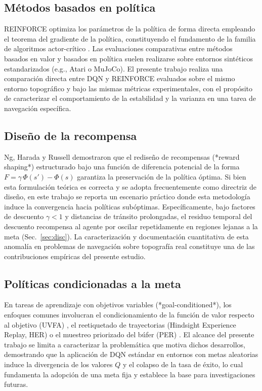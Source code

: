 \subsection{Métodos basados en política}
REINFORCE \cite{williams1992} optimiza los parámetros de la política de forma directa empleando el teorema del gradiente de la política, constituyendo el fundamento de la familia de algoritmos actor-crítico \cite{mnih2016}. Las evaluaciones comparativas entre métodos basados en valor y basados en política suelen realizarse sobre entornos sintéticos estandarizados (e.g., Atari o MuJoCo). El presente trabajo realiza una comparación directa entre DQN y REINFORCE evaluados sobre el mismo entorno topográfico y bajo las mismas métricas experimentales, con el propósito de caracterizar el comportamiento de la estabilidad y la varianza en una tarea de navegación específica.

\subsection{Diseño de la recompensa}
Ng, Harada y Russell \cite{ng1999} demostraron que el rediseño de recompensas (*reward shaping*) estructurado bajo una función de diferencia potencial de la forma $F=\gamma\,\Phi(s')-\Phi(s)$ garantiza la preservación de la política óptima. Si bien esta formulación teórica es correcta y se adopta frecuentemente como directriz de diseño, en este trabajo se reporta un escenario práctico donde esta metodología induce la convergencia hacia políticas subóptimas. Específicamente, bajo factores de descuento $\gamma < 1$ y distancias de tránsito prolongadas, el residuo temporal del descuento recompensa al agente por oscilar repetidamente en regiones lejanas a la meta (Sec.~\ref{sec:disc}). La caracterización y documentación cuantitativa de esta anomalía en problemas de navegación sobre topografía real constituye una de las contribuciones empíricas del presente estudio.

\subsection{Políticas condicionadas a la meta}
En tareas de aprendizaje con objetivos variables (*goal-conditioned*), los enfoques comunes involucran el condicionamiento de la función de valor respecto al objetivo (UVFA) \cite{schaul2015}, el reetiquetado de trayectorias (Hindsight Experience Replay, HER) \cite{andrychowicz2017} o el muestreo priorizado del búfer (PER) \cite{schaul2016}. El alcance del presente trabajo se limita a caracterizar la problemática que motiva dichos desarrollos, demostrando que la aplicación de DQN estándar en entornos con metas aleatorias induce la divergencia de los valores $Q$ y el colapso de la tasa de éxito, lo cual fundamenta la adopción de una meta fija y establece la base para investigaciones futuras.


